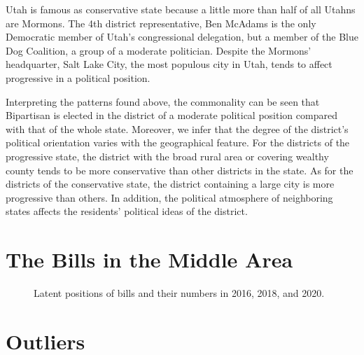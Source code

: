 \documentclass[a4paper, 11pt]{report}
\begin{document}
\begin{itemize}
\quad Utah is famous as conservative state because a little more than half of all Utahns are Mormons. The 4th district representative, Ben McAdams is the only Democratic member of Utah's congressional delegation, but a member of the Blue Dog Coalition, a group of a moderate politician. Despite the Mormons' headquarter, Salt Lake City, the most populous city in Utah, tends to affect progressive in a political position.

\quad Interpreting the patterns found above, the commonality can be seen that Bipartisan is elected in the district of a moderate political position compared with that of the whole state. Moreover, we infer that the degree of the district's political orientation varies with the geographical feature. For the districts of the progressive state, the district with the broad rural area or covering wealthy county tends to be more conservative than other districts in the state. As for the districts of the conservative state, the district containing a large city is more progressive than others. In addition, the political atmosphere of neighboring states affects the residents' political ideas of the district.

\section{The Bills in the Middle Area}

\begin{figure}[h]
  \begin{center}
  \end{center}
  \caption{Latent positions of bills and their numbers in 2016, 2018, and 2020. }
  \label{fig:bill}
\end{figure}

\section{Outliers}


\end{itemize}

\end{document}
